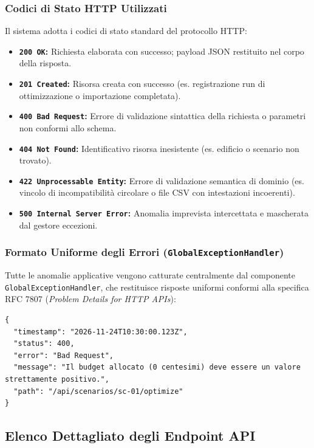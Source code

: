 \subsubsection{Codici di Stato HTTP Utilizzati}
Il sistema adotta i codici di stato standard del protocollo HTTP:
\begin{itemize}[leftmargin=1.5em, itemsep=0.15em]
    \item \textbf{\texttt{200 OK}:} Richiesta elaborata con successo; payload JSON restituito nel corpo della risposta.
    \item \textbf{\texttt{201 Created}:} Risorsa creata con successo (es. registrazione run di ottimizzazione o importazione completata).
    \item \textbf{\texttt{400 Bad Request}:} Errore di validazione sintattica della richiesta o parametri non conformi allo schema.
    \item \textbf{\texttt{404 Not Found}:} Identificativo risorsa inesistente (es. edificio o scenario non trovato).
    \item \textbf{\texttt{422 Unprocessable Entity}:} Errore di validazione semantica di dominio (es. vincolo di incompatibilità circolare o file CSV con intestazioni incoerenti).
    \item \textbf{\texttt{500 Internal Server Error}:} Anomalia imprevista intercettata e mascherata dal gestore eccezioni.
\end{itemize}

\subsubsection{Formato Uniforme degli Errori (\texttt{GlobalExceptionHandler})}
Tutte le anomalie applicative vengono catturate centralmente dal componente \texttt{GlobalExceptionHandler}, che restituisce risposte uniformi conformi alla specifica RFC 7807 (\emph{Problem Details for HTTP APIs}):
\begin{lstlisting}[caption={Struttura JSON standardizzata per la segnalazione degli errori.}]
{
  "timestamp": "2026-11-24T10:30:00.123Z",
  "status": 400,
  "error": "Bad Request",
  "message": "Il budget allocato (0 centesimi) deve essere un valore strettamente positivo.",
  "path": "/api/scenarios/sc-01/optimize"
}
\end{lstlisting}

\subsection{Elenco Dettagliato degli Endpoint API}

